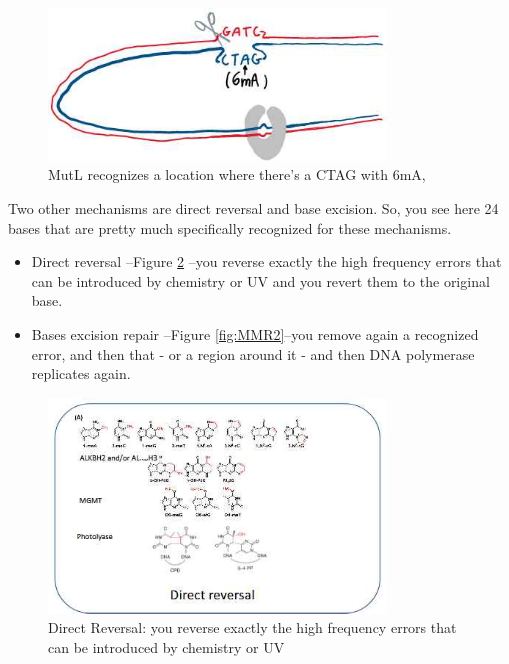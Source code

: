 \documentclass[]{article}
\begin{document}
\begin{figure}[H]
	\caption{MutL recognizes a location where there's a CTAG with 6mA,}\label{fig:DNA-MMR}
	\includegraphics[width=0.8\textwidth]{DNA-MMR}
\end{figure}

Two other mechanisms are direct reversal and base excision.
So, you see here 24 bases that are pretty much specifically recognized for these mechanisms.
\begin{itemize}
	\item Direct reversal --Figure \ref{fig:MMR1} --you reverse exactly the high frequency errors
	that can be introduced by chemistry or UV
	and you revert them to the original base.
    \item Bases excision repair --Figure \ref{fig:MMR2}--you remove again a recognized error, and then that - or a region around it - 	and then DNA polymerase replicates again.
\end{itemize}

\begin{figure}[H]
	\begin{center}
		\caption[Direct Reversal]{Direct Reversal: you reverse exactly the high frequency errors 	that can be introduced by chemistry or UV}\label{fig:MMR1}
		\includegraphics[width=0.8\textwidth]{MMR1}
	\end{center}
\end{figure}
\end{document}
